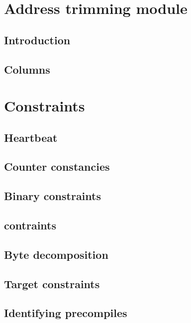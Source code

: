 \section{Address trimming module}
\subsection{Introduction}               
\subsection{Columns}                    

\section{Constraints}
\subsection{Heartbeat}                  \label{sec: heartbeat} 
\subsection{Counter constancies}        
\subsection{Binary constraints}         
\subsection{\plateauBit{} contraints}   
\subsection{Byte decomposition}         
\subsection{Target constraints}         
\subsection{Identifying precompiles}    
